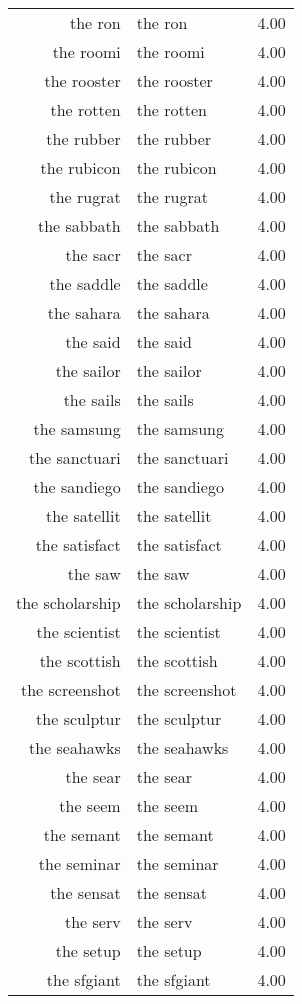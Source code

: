 \begin{table}[ht]
\begin{tabular}{rlr}
  the ron & the ron & 4.00 \\ 
  the roomi & the roomi & 4.00 \\ 
  the rooster & the rooster & 4.00 \\ 
  the rotten & the rotten & 4.00 \\ 
  the rubber & the rubber & 4.00 \\ 
  the rubicon & the rubicon & 4.00 \\ 
  the rugrat & the rugrat & 4.00 \\ 
  the sabbath & the sabbath & 4.00 \\ 
  the sacr & the sacr & 4.00 \\ 
  the saddle & the saddle & 4.00 \\ 
  the sahara & the sahara & 4.00 \\ 
  the said & the said & 4.00 \\ 
  the sailor & the sailor & 4.00 \\ 
  the sails & the sails & 4.00 \\ 
  the samsung & the samsung & 4.00 \\ 
  the sanctuari & the sanctuari & 4.00 \\ 
  the sandiego & the sandiego & 4.00 \\ 
  the satellit & the satellit & 4.00 \\ 
  the satisfact & the satisfact & 4.00 \\ 
  the saw & the saw & 4.00 \\ 
  the scholarship & the scholarship & 4.00 \\ 
  the scientist & the scientist & 4.00 \\ 
  the scottish & the scottish & 4.00 \\ 
  the screenshot & the screenshot & 4.00 \\ 
  the sculptur & the sculptur & 4.00 \\ 
  the seahawks & the seahawks & 4.00 \\ 
  the sear & the sear & 4.00 \\ 
  the seem & the seem & 4.00 \\ 
  the semant & the semant & 4.00 \\ 
  the seminar & the seminar & 4.00 \\ 
  the sensat & the sensat & 4.00 \\ 
  the serv & the serv & 4.00 \\ 
  the setup & the setup & 4.00 \\ 
  the sfgiant & the sfgiant & 4.00 \\ 

\end{tabular}
\end{table}
